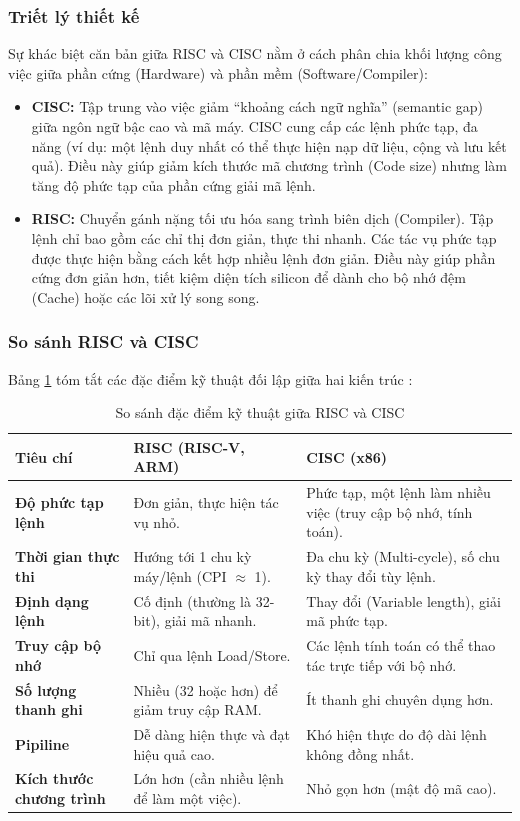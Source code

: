 \subsubsection{Triết lý thiết kế}
Sự khác biệt căn bản giữa RISC và CISC nằm ở cách phân chia khối lượng công việc giữa phần cứng (Hardware) và phần mềm (Software/Compiler):

\begin{itemize}
    \item \textbf{CISC:} Tập trung vào việc giảm ``khoảng cách ngữ nghĩa'' (semantic gap) giữa ngôn ngữ bậc cao và mã máy. CISC cung cấp các lệnh phức tạp, đa năng (ví dụ: một lệnh duy nhất có thể thực hiện nạp dữ liệu, cộng và lưu kết quả). Điều này giúp giảm kích thước mã chương trình (Code size) nhưng làm tăng độ phức tạp của phần cứng giải mã lệnh.
    \item \textbf{RISC:} Chuyển gánh nặng tối ưu hóa sang trình biên dịch (Compiler). Tập lệnh chỉ bao gồm các chỉ thị đơn giản, thực thi nhanh. Các tác vụ phức tạp được thực hiện bằng cách kết hợp nhiều lệnh đơn giản. Điều này giúp phần cứng đơn giản hơn, tiết kiệm diện tích silicon để dành cho bộ nhớ đệm (Cache) hoặc các lõi xử lý song song.
\end{itemize}



\subsubsection{So sánh RISC và CISC}
Bảng \ref{tab:risc_vs_cisc} tóm tắt các đặc điểm kỹ thuật đối lập giữa hai kiến trúc \cite{risc-v}:

\begin{table}[h]
\centering
\begin{tabular}{|p{4cm}|p{5.5cm}|p{5.5cm}|}
\hline
\textbf{Tiêu chí} & \textbf{RISC (RISC-V, ARM)} & \textbf{CISC (x86)} \\ \hline
\textbf{Độ phức tạp lệnh} & Đơn giản, thực hiện tác vụ nhỏ. & Phức tạp, một lệnh làm nhiều việc (truy cập bộ nhớ, tính toán). \\ \hline
\textbf{Thời gian thực thi} & Hướng tới 1 chu kỳ máy/lệnh (CPI $\approx$ 1). & Đa chu kỳ (Multi-cycle), số chu kỳ thay đổi tùy lệnh. \\ \hline
\textbf{Định dạng lệnh} & Cố định (thường là 32-bit), giải mã nhanh. & Thay đổi (Variable length), giải mã phức tạp. \\ \hline
\textbf{Truy cập bộ nhớ} & Chỉ qua lệnh Load/Store. & Các lệnh tính toán có thể thao tác trực tiếp với bộ nhớ. \\ \hline
\textbf{Số lượng thanh ghi} & Nhiều (32 hoặc hơn) để giảm truy cập RAM. & Ít thanh ghi chuyên dụng hơn. \\ \hline
\textbf{Pipiline} & Dễ dàng hiện thực và đạt hiệu quả cao. & Khó hiện thực do độ dài lệnh không đồng nhất. \\ \hline
\textbf{Kích thước chương trình} & Lớn hơn (cần nhiều lệnh để làm một việc). & Nhỏ gọn hơn (mật độ mã cao). \\ \hline
\end{tabular}
\caption{So sánh đặc điểm kỹ thuật giữa RISC và CISC}
\label{tab:risc_vs_cisc}
\end{table}


